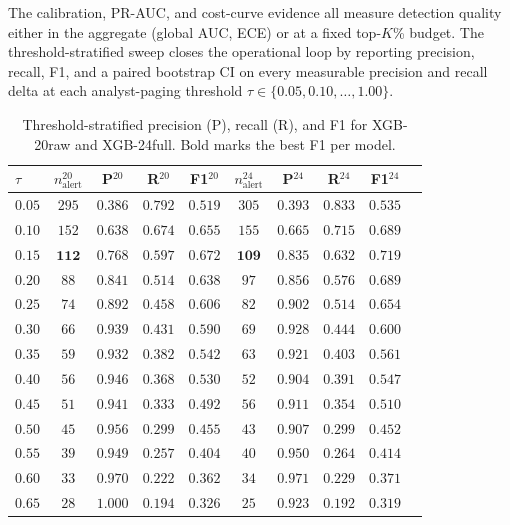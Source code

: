 The calibration, PR-AUC, and cost-curve evidence all measure detection
quality either in the aggregate (global AUC, ECE) or at a fixed
top-$K$\% budget. The threshold-stratified sweep closes the
operational loop by reporting precision, recall, F1, and a paired
bootstrap CI on every measurable precision and recall delta at each
analyst-paging threshold $\tau \in \{0.05, 0.10, \dots, 1.00\}$.

\begin{table}[t]
\centering
\small
\caption{Threshold-stratified precision (P), recall (R), and F1 for
XGB-20raw and XGB-24full. Bold marks the best F1 per model.}
\label{tab:p8-evidence-threshold-f1}
\begin{tabular}{lccccccccc}
\toprule
$\tau$ & $n_\text{alert}^\text{20}$ & P$^\text{20}$ & R$^\text{20}$ & F1$^\text{20}$ &
$n_\text{alert}^\text{24}$ & P$^\text{24}$ & R$^\text{24}$ & F1$^\text{24}$ \\
\midrule
$0.05$ & $295$ & $0.386$ & $0.792$ & $0.519$ & $305$ & $0.393$ & $0.833$ & $0.535$ \\
$0.10$ & $152$ & $0.638$ & $0.674$ & $0.655$ & $155$ & $0.665$ & $0.715$ & $0.689$ \\
$\mathbf{0.15}$ & $\mathbf{112}$ & $\mathbf{0.768}$ & $\mathbf{0.597}$ & $\mathbf{0.672}$ &
$\mathbf{109}$ & $\mathbf{0.835}$ & $\mathbf{0.632}$ & $\mathbf{0.719}$ \\
$0.20$ & $88$ & $0.841$ & $0.514$ & $0.638$ & $97$ & $0.856$ & $0.576$ & $0.689$ \\
$0.25$ & $74$ & $0.892$ & $0.458$ & $0.606$ & $82$ & $0.902$ & $0.514$ & $0.654$ \\
$0.30$ & $66$ & $0.939$ & $0.431$ & $0.590$ & $69$ & $0.928$ & $0.444$ & $0.600$ \\
$0.35$ & $59$ & $0.932$ & $0.382$ & $0.542$ & $63$ & $0.921$ & $0.403$ & $0.561$ \\
$0.40$ & $56$ & $0.946$ & $0.368$ & $0.530$ & $52$ & $0.904$ & $0.391$ & $0.547$ \\
$0.45$ & $51$ & $0.941$ & $0.333$ & $0.492$ & $56$ & $0.911$ & $0.354$ & $0.510$ \\
$0.50$ & $45$ & $0.956$ & $0.299$ & $0.455$ & $43$ & $0.907$ & $0.299$ & $0.452$ \\
$0.55$ & $39$ & $0.949$ & $0.257$ & $0.404$ & $40$ & $0.950$ & $0.264$ & $0.414$ \\
$0.60$ & $33$ & $0.970$ & $0.222$ & $0.362$ & $34$ & $0.971$ & $0.229$ & $0.371$ \\
$0.65$ & $28$ & $1.000$ & $0.194$ & $0.326$ & $25$ & $0.923$ & $0.192$ & $0.319$ \\

\end{tabular}
\end{table}
